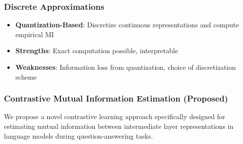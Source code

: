 \subsubsection{Discrete Approximations}
\begin{itemize}
    \item \textbf{Quantization-Based}: Discretize continuous representations and compute empirical MI
    \item \textbf{Strengths}: Exact computation possible, interpretable
    \item \textbf{Weaknesses}: Information loss from quantization, choice of discretization scheme
\end{itemize}

\subsubsection{Contrastive Mutual Information Estimation (Proposed)}
We propose a novel contrastive learning approach specifically designed for estimating mutual information between intermediate layer representations in language models during question-answering tasks.

